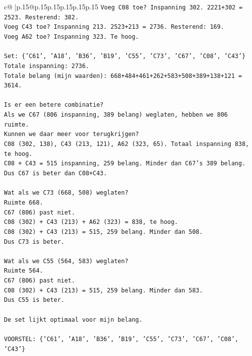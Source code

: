 \documentclass{article}
\begin{document}
{\begin{supertabular}{c@{$\;$}|p{.15\linewidth}@{}p{.15\linewidth}p{.15\linewidth}p{.15\linewidth}p{.15\linewidth}p{.15\linewidth}}
{{{\texttt{Voeg C08 toe? Inspanning 302. 2221+302 = 2523. Resterend: 382.} \\
\texttt{Voeg C43 toe? Inspanning 213. 2523+213 = 2736. Resterend: 169.} \\
\texttt{Voeg A62 toe? Inspanning 323. Te hoog.} \\
\\ 
\texttt{Set: \{'C61', 'A18', 'B36', 'B19', 'C55', 'C73', 'C67', 'C08', 'C43'\}} \\
\texttt{Totale inspanning: 2736.} \\
\texttt{Totale belang (mijn waarden): 668+484+461+262+583+508+389+138+121 = 3614.} \\
\\ 
\texttt{Is er een betere combinatie?} \\
\texttt{Als we C67 (806 inspanning, 389 belang) weglaten, hebben we 806 ruimte.} \\
\texttt{Kunnen we daar meer voor terugkrijgen?} \\
\texttt{C08 (302, 138), C43 (213, 121), A62 (323, 65). Totaal inspanning 838, te hoog.} \\
\texttt{C08 + C43 = 515 inspanning, 259 belang. Minder dan C67's 389 belang.} \\
\texttt{Dus C67 is beter dan C08+C43.} \\
\\ 
\texttt{Wat als we C73 (668, 508) weglaten?} \\
\texttt{Ruimte 668.} \\
\texttt{C67 (806) past niet.} \\
\texttt{C08 (302) + C43 (213) + A62 (323) = 838, te hoog.} \\
\texttt{C08 (302) + C43 (213) = 515, 259 belang. Minder dan 508.} \\
\texttt{Dus C73 is beter.} \\
\\ 
\texttt{Wat als we C55 (564, 583) weglaten?} \\
\texttt{Ruimte 564.} \\
\texttt{C67 (806) past niet.} \\
\texttt{C08 (302) + C43 (213) = 515, 259 belang. Minder dan 583.} \\
\texttt{Dus C55 is beter.} \\
\\ 
\texttt{De set lijkt optimaal voor mijn belang.} \\
\\ 
\texttt{VOORSTEL: \{'C61', 'A18', 'B36', 'B19', 'C55', 'C73', 'C67', 'C08', 'C43'\}} \\
}}}
\end{supertabular}}
\end{document}
